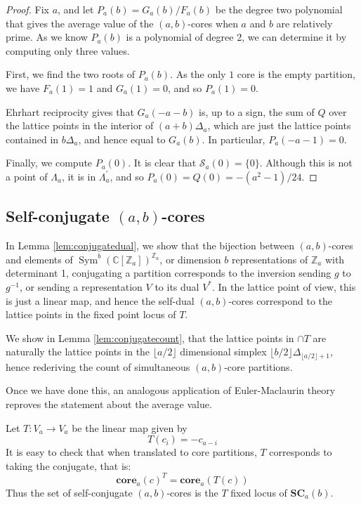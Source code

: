 \documentclass{amsart}[12pt]
\theoremstyle{definition}
\newcommand{\Z}{\mathbb{Z}}
\newcommand{\C}{\mathbb{C}}
\newcommand{\core}{\mathbf{core}}
\newcommand{\SC}{\mathbf{SC}}
\DeclareMathOperator{\Sym}{Sym}
\begin{document}
\begin{proof}

Fix $a$, and let $P_a(b)=G_a(b)/F_a(b)$ be the degree two polynomial that
gives the average value of the $(a,b)$-cores when $a$ and $b$ are
relatively prime.  As we know $P_a(b)$ is a polynomial of degree 2, we can determine it by computing only three values.

First, we find the two roots of $P_a(b)$.  As the only $1$ core is the empty partition, we have $F_a(1)=1$ and $G_a(1)=0$, and so $P_a(1)=0$.

Ehrhart reciprocity gives that $G_a(-a-b)$ is, up to a sign, the sum of $Q$ over the lattice points in the interior of $(a+b)\Delta_a$, which are just the lattice points contained in $b\Delta_a$, and hence equal to $G_a(b)$.  In particular, $P_a(-a-1)=0$.  

Finally, we compute $P_a(0)$.  It is clear that $\mathcal{S}_a(0)=\{0\}$.  Although this is not a point of $\Lambda_a$, it is in $\Lambda_a^\prime$, and so $P_a(0)=Q(0)=-(a^2-1)/24$.
\end{proof}

\subsection{Self-conjugate \texorpdfstring{$(a,b)$}{(a,b)}-cores} \label{sec:conjugate}

In Lemma \ref{lem:conjugatedual}, we show that the bijection between $(a,b)$-cores and elements of $\Sym^b(\C[\Z_a])^{\Z_a}$, or dimension $b$ representations of $\Z_a$ with determinant 1, conjugating a partition corresponds to the inversion sending $g$ to $g^{-1}$, or sending a representation $V$ to its dual $V^*$.  In the lattice point of view, this is just a linear map, and hence the self-dual $(a,b)$-cores correspond to the lattice points in the fixed point locus of $T$.  

We show in Lemma \ref{lem:conjugatecount}, that the lattice points in $ \cap T$ are naturally the lattice points in the $\lfloor a/2\rfloor$ dimensional simplex $\lfloor b/2\rfloor \Delta_{\lfloor a/2\rfloor +1}$, hence rederiving the count of simultaneous $(a,b)$-core partitions.  

Once we have done this, an analogous application of Euler-Maclaurin theory reproves the statement about the average value.

Let $T:V_a\to V_a$ be the linear map given by
$$T(c_i)=-c_{a-i}$$
It is easy to check that when translated to core partitions, $T$ corresponds to taking the conjugate, that is: $$\core_a(c)^T=\core_a(T(c))$$
Thus the set of self-conjugate $(a,b)$-cores is the $T$ fixed locus of $\SC_a(b)$.  
\end{document}
